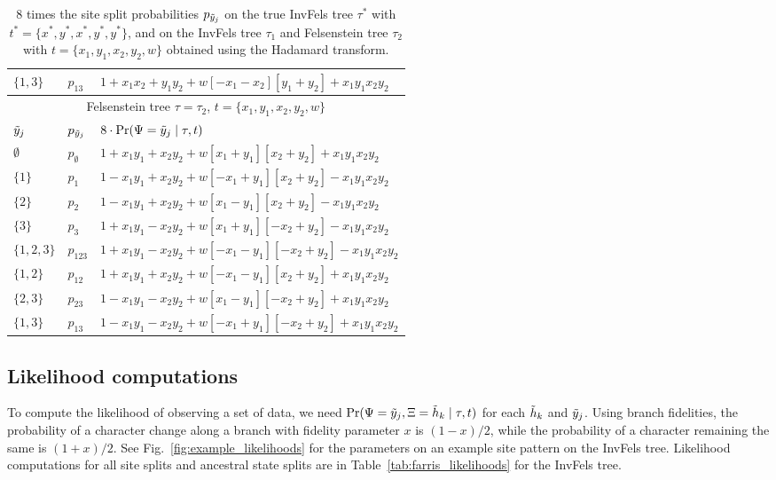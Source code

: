 \begin{table}[ht]
\begin{tabular}{|l|l|l|}
    $\{1,3\}$   & $p_{13}$          &$1 + x_1x_2 +  y_1y_2 +  w[- x_1 - x_2][  y_1 + y_2] + x_1y_1x_2y_2$\\
    \hline
    \multicolumn{3}{c}{Felsenstein tree $\tau=\tau_2$, $t=\{x_1,y_1,x_2,y_2,w\}$}\\
    \hline
$\tilde{y}_j$  & $p_{\tilde{y}_j}$ &$8\cdot\Pr(\Psi=\tilde{y}_j \mid \tau,t)$\\
    \hline
    $\emptyset$ & $p_{\emptyset}$   &$1 + x_1y_1 +  x_2y_2 +  w[  x_1 + y_1][  x_2 + y_2] + x_1y_1x_2y_2$\\
    $\{1\}$     & $p_{1}$           &$1 - x_1y_1 +  x_2y_2 +  w[ -x_1 + y_1][  x_2 + y_2] - x_1y_1x_2y_2$\\
    $\{2\}$     & $p_{2}$           &$1 - x_1y_1 +  x_2y_2 +  w[  x_1 - y_1][  x_2 + y_2] - x_1y_1x_2y_2$\\
    $\{3\}$     & $p_{3}$           &$1 + x_1y_1 -  x_2y_2 +  w[  x_1 + y_1][ -x_2 + y_2] - x_1y_1x_2y_2$\\
    $\{1,2,3\}$ & $p_{123}$         &$1 + x_1y_1 -  x_2y_2 +  w[ -x_1 - y_1][ -x_2 + y_2] - x_1y_1x_2y_2$\\
    $\{1,2\}$   & $p_{12}$          &$1 + x_1y_1 +  x_2y_2 +  w[ -x_1 - y_1][  x_2 + y_2] + x_1y_1x_2y_2$\\
    $\{2,3\}$   & $p_{23}$          &$1 - x_1y_1 -  x_2y_2 +  w[  x_1 - y_1][ -x_2 + y_2] + x_1y_1x_2y_2$\\
    $\{1,3\}$   & $p_{13}$          &$1 - x_1y_1 -  x_2y_2 +  w[ -x_1 + y_1][ -x_2 + y_2] + x_1y_1x_2y_2$\\
    \hline
\end{tabular}
\caption{8 times the site split probabilities $p_{\tilde{y}_j}$ on the true InvFels tree $\tau^*$ with $t^*=\{x^*,y^*,x^*,y^*,y^*\}$, and on the InvFels tree $\tau_1$ and Felsenstein tree $\tau_2$ with $t=\{x_1,y_1,x_2,y_2,w\}$ obtained using the Hadamard transform.
}
\label{tab:gen-sitepatprob}
\end{table}

\subsection*{Likelihood computations}

To compute the likelihood of observing a set of data, we need $\Pr(\Psi=\tilde{y}_j, \Xi=\tilde{h}_k \mid \tau, t)$ for each $\tilde{h}_k$ and $\tilde{y}_j$.
Using branch fidelities, the probability of a character change along a branch with fidelity parameter $x$ is $(1-x)/2$, while the probability of a character remaining the same is $(1+x)/2$.
See Fig.~\ref{fig:example_likelihoods} for the parameters on an example site pattern on the InvFels tree.
Likelihood computations for all site splits and ancestral state splits are in Table~\ref{tab:farris_likelihoods} for the InvFels tree.

